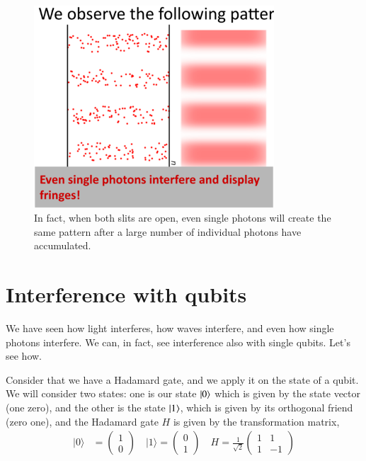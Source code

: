 \begin{figure}[H]
   \centering
    \includegraphics[width=0.8\textwidth]{lesson6/block_neither_reality.pdf}    
        \caption{In fact, when both slits are open, even single photons will create the same pattern after a large number of individual photons have accumulated.}
        \label{fig:two-slit-single-photon-pattern}

\end{figure}


\section{Interference with qubits}




We have seen how light interferes, how waves interfere, and even how single photons interfere. We can, in fact, see interference also with single qubits. Let's see how.

Consider that we have a Hadamard gate, and we apply it on the state of a qubit. We will consider two states: one is our state $\left| 0 \right\rangle$ which is given by the state vector (one zero), and the other is the state $\left| 1 \right\rangle$, which is given by its orthogonal friend (zero one), and the Hadamard gate $H$ is given by the transformation matrix,
\begin{equation}
\begin{aligned}
|0\rangle &=\left(\begin{array}{l}
1 \\
0
\end{array}\right) \quad|1\rangle=\left(\begin{array}{l}
0 \\
1
\end{array}\right) \quad H=\frac{1}{\sqrt{2}}\left(\begin{array}{cc}
1 & 1 \\
1 & -1
\end{array}\right)
\end{aligned}
\end{equation}


